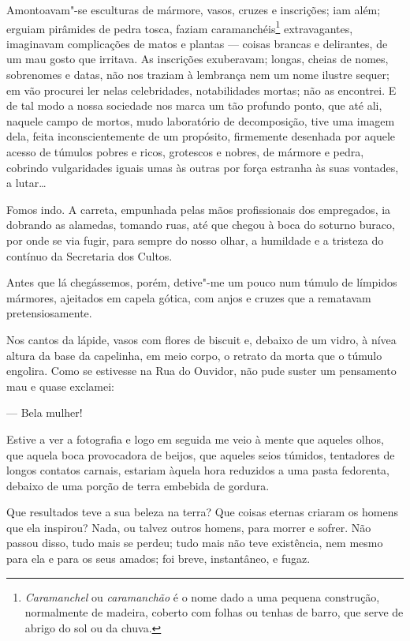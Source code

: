 Amontoavam"-se esculturas de mármore, vasos, cruzes e inscrições; iam
além; erguiam pirâmides de pedra tosca, faziam caramanchéis\footnote{\emph{Caramanchel}
  ou \emph{caramanchão} é o nome dado a uma pequena construção,
  normalmente de madeira, coberto com folhas ou tenhas de barro, que
  serve de abrigo do sol ou da chuva.} extravagantes, imaginavam
complicações de matos e plantas --- coisas brancas e delirantes, de um
mau gosto que irritava. As inscrições exuberavam; longas, cheias de
nomes, sobrenomes e datas, não nos traziam à lembrança nem um nome
ilustre sequer; em vão procurei ler nelas celebridades, notabilidades
mortas; não as encontrei. E de tal modo a nossa sociedade nos marca um
tão profundo ponto, que até ali, naquele campo de mortos, mudo
laboratório de decomposição, tive uma imagem dela, feita
inconscientemente de um propósito, firmemente desenhada por aquele
acesso de túmulos pobres e ricos, grotescos e nobres, de mármore e
pedra, cobrindo vulgaridades iguais umas às outras por força estranha às
suas vontades, a lutar\ldots{}

Fomos indo. A carreta, empunhada pelas mãos profissionais dos
empregados, ia dobrando as alamedas, tomando ruas, até que chegou à boca
do soturno buraco, por onde se via fugir, para sempre do nosso olhar, a
humildade e a tristeza do contínuo da Secretaria dos Cultos.

Antes que lá chegássemos, porém, detive"-me um pouco num túmulo de
límpidos mármores, ajeitados em capela gótica, com anjos e cruzes que a
rematavam pretensiosamente.

Nos cantos da lápide, vasos com flores de biscuit e, debaixo de um
vidro, à nívea altura da base da capelinha, em meio corpo, o retrato da
morta que o túmulo engolira. Como se estivesse na Rua do Ouvidor, não
pude suster um pensamento mau e quase exclamei:

--- Bela mulher!

Estive a ver a fotografia e logo em seguida me veio à mente que aqueles
olhos, que aquela boca provocadora de beijos, que aqueles seios túmidos,
tentadores de longos contatos carnais, estariam àquela hora reduzidos a
uma pasta fedorenta, debaixo de uma porção de terra embebida de gordura.

Que resultados teve a sua beleza na terra? Que coisas eternas criaram os
homens que ela inspirou? Nada, ou talvez outros homens, para morrer e
sofrer. Não passou disso, tudo mais se perdeu; tudo mais não teve
existência, nem mesmo para ela e para os seus amados; foi breve,
instantâneo, e fugaz.

